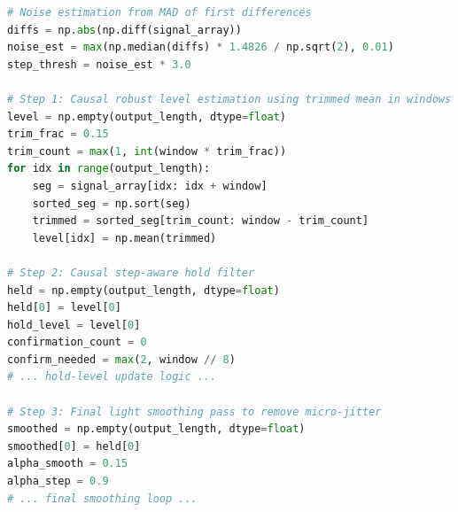 \begin{lstlisting}[language=Python,caption={Abridged excerpt of the direct single-task baseline for the step-changes task.},label={lst:emosta-step-baseline}]
# Noise estimation from MAD of first differences
diffs = np.abs(np.diff(signal_array))
noise_est = max(np.median(diffs) * 1.4826 / np.sqrt(2), 0.01)
step_thresh = noise_est * 3.0

# Step 1: Causal robust level estimation using trimmed mean in windows
level = np.empty(output_length, dtype=float)
trim_frac = 0.15
trim_count = max(1, int(window * trim_frac))
for idx in range(output_length):
    seg = signal_array[idx: idx + window]
    sorted_seg = np.sort(seg)
    trimmed = sorted_seg[trim_count: window - trim_count]
    level[idx] = np.mean(trimmed)

# Step 2: Causal step-aware hold filter
held = np.empty(output_length, dtype=float)
held[0] = level[0]
hold_level = level[0]
confirmation_count = 0
confirm_needed = max(2, window // 8)
# ... hold-level update logic ...

# Step 3: Final light smoothing pass to remove micro-jitter
smoothed = np.empty(output_length, dtype=float)
smoothed[0] = held[0]
alpha_smooth = 0.15
alpha_step = 0.9
# ... final smoothing loop ...
\end{lstlisting}
